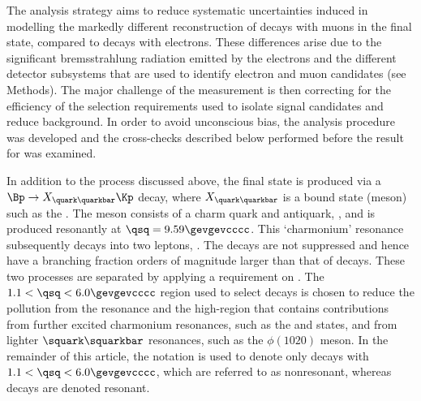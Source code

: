 The analysis strategy aims to reduce systematic uncertainties induced in modelling the markedly different reconstruction of decays with muons in the final state, compared to decays with electrons. These differences arise due to the significant bremsstrahlung radiation emitted by the electrons and the different detector subsystems that are used to identify electron and muon candidates (see Methods). The major challenge of the measurement is then correcting for the efficiency of the selection requirements used to isolate signal candidates and reduce background. In order to avoid unconscious bias, the analysis procedure was developed and the cross-checks described below performed before the result for \RK was examined. 

In addition to the process discussed above, the \Kll final state is produced via a $\Bp \to X_{\quark\quarkbar}\Kp$ decay, where $X_{\quark\quarkbar}$ is a bound state (meson) such as the \jpsi. The \jpsi meson consists of a charm quark and antiquark, \cquark\cquarkbar, and is produced resonantly at $\qsq=9.59\gevgevcccc$. This ‘charmonium’ resonance subsequently decays into two leptons, \Jpsill. The \BuJpsiKll decays are not suppressed and hence have a branching fraction 
orders of magnitude larger than that of \BuKll decays.
These two processes are separated by applying a requirement on \qsq. The $1.1 < \qsq < 6.0 \gevgevcccc$ region used to select \BuKll decays is chosen to reduce the pollution from the \jpsi resonance and the high-\qsq region that contains contributions from further excited charmonium resonances, such as the \psitwos and \psiprpr states, and from lighter $\squark\squarkbar$ resonances, such as the $\phi(1020)$ meson. In the remainder of this article, the notation \BuKll is used to denote only decays with \mbox{$1.1<\qsq<6.0\gevgevcccc$}, which are referred to as nonresonant, whereas \BuJpsiKll decays are denoted resonant.


